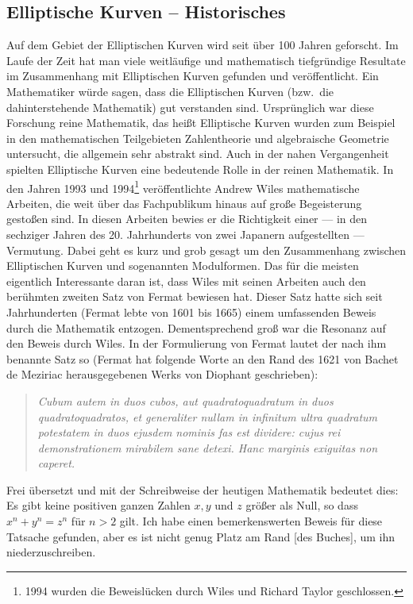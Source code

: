 \begin{refsegment}
\section{Elliptische Kurven -- Historisches}

Auf dem Gebiet der Elliptischen Kurven wird seit über 100 Jahren geforscht. Im Laufe der Zeit hat man
viele weitläufige und mathematisch tiefgründige Resultate im Zusammenhang mit Elliptischen Kurven gefunden
und veröffentlicht. Ein Mathematiker würde sagen, dass die Elliptischen Kurven
(bzw.\ die dahinterstehende Mathematik) gut verstanden sind. Ursprünglich war diese Forschung reine
Mathematik, das heißt Elliptische Kurven wurden zum Beispiel in den mathematischen Teilgebieten
Zahlentheorie und algebraische Geometrie untersucht, die allgemein sehr abstrakt sind. Auch in der
nahen Vergangenheit spielten Elliptische Kurven eine bedeutende Rolle in der reinen Mathematik. In den
Jahren 1993 und 1994\footnote%
{
  1994 wurden die Beweislücken durch Wiles und Richard Taylor geschlossen.
}
veröffentlichte Andrew Wiles mathematische Arbeiten, die weit über das Fachpublikum
hinaus auf große Begeisterung gestoßen sind. In diesen Arbeiten bewies er die Richtigkeit einer --- in
den sechziger Jahren des 20. Jahrhunderts von zwei Japanern aufgestellten --- Vermutung. Dabei geht es
kurz und grob gesagt um den Zusammenhang zwischen Elliptischen Kurven und sogenannten Modulformen.
Das für die meisten eigentlich Interessante daran ist, dass Wiles mit seinen Arbeiten auch den berühmten
zweiten Satz von Fermat bewiesen hat. Dieser Satz hatte sich seit Jahrhunderten
(Fermat lebte von 1601 bis 1665) einem umfassenden Beweis durch die Mathematik
entzogen. Dementsprechend
groß war die Resonanz auf den Beweis durch Wiles. In der Formulierung von Fermat lautet der nach ihm
benannte Satz so (Fermat hat folgende Worte an den Rand des 1621 von Bachet de Meziriac
herausgegebenen Werks von Diophant geschrieben):

\begin{quote} {\em
Cubum autem in duos cubos, aut quadratoquadratum in duos quadratoquadratos, et
generaliter nullam in infinitum ultra quadratum potestatem in duos ejusdem nominis
fas est dividere: cujus rei demonstrationem mirabilem sane detexi. Hanc marginis
exiguitas non caperet.
} \end{quote}

Frei übersetzt und mit der Schreibweise der heutigen Mathematik bedeutet dies:\\
Es gibt keine positiven ganzen Zahlen $x, y$ und $z$ größer als Null, so dass
$x^n + y^n = z^n$ für $n>2$ gilt.
Ich habe einen bemerkenswerten Beweis für diese Tatsache gefunden, aber es ist
nicht genug Platz am Rand [des Buches], um ihn niederzuschreiben.


\end{refsegment}
